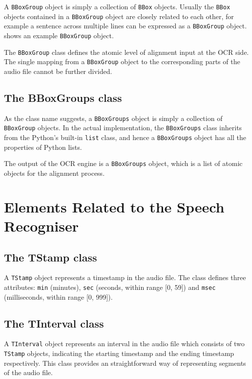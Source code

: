 A \texttt{BBoxGroup} object is simply a collection of \texttt{BBox} objects. Usually the \texttt{BBox} objects contained in a \texttt{BBoxGroup} object are closely related to each other, for example a sentence across multiple lines can be expressed as a \texttt{BBoxGroup} object.  shows an example \texttt{BBoxGroup} object.

The \texttt{BBoxGroup} class defines the atomic level of alignment input at the OCR side. The single mapping from a \texttt{BBoxGroup} object to the corresponding parts of the audio file cannot be further divided.

\subsection{The BBoxGroups class}

As the class name suggests, a \texttt{BBoxGroups} object is simply a collection of \texttt{BBoxGroup} objects. In the actual implementation, the \texttt{BBoxGroups} class inherits from the Python's built-in \texttt{list} class, and hence a \texttt{BBoxGroups} object has all the properties of Python lists.

The output of the OCR engine is a \texttt{BBoxGroups} object, which is a list of atomic objects for the alignment process. 

\section{Elements Related to the Speech Recogniser}

\subsection{The TStamp class}

A \texttt{TStamp} object represents a timestamp in the audio file. The class defines three attributes: \texttt{min} (minutes), \texttt{sec} (seconds, within range [0, 59]) and \texttt{msec} (milliseconds, within range [0, 999]).

\subsection{The TInterval class}

A \texttt{TInterval} object represents an interval in the audio file which consists of two \texttt{TStamp} objects, indicating the starting timestamp and the ending timestamp respectively. This class provides an straightforward way of representing segments of the audio file.

